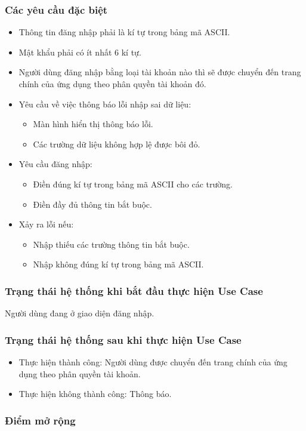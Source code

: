 \subsubsection{Các yêu cầu đặc biệt}
\begin{itemize}
  \item Thông tin đăng nhập phải là kí tự trong bảng mã ASCII.
  \item Mật khẩu phải có ít nhất 6 kí tự.
  \item Người dùng đăng nhập bằng loại tài khoản nào thì sẽ được chuyển đến trang chính của ứng dụng theo phân quyền tài khoản đó.
  \item Yêu cầu về việc thông báo lỗi nhập sai dữ liệu:
    \begin{itemize}
      \item Màn hình hiển thị thông báo lỗi.
      \item Các trường dữ liệu không hợp lệ được bôi đỏ.
    \end{itemize}
  \item Yêu cầu đăng nhập:
    \begin{itemize}
      \item Điền đúng kí tự trong bảng mã ASCII cho các trường.
      \item Điền đầy đủ thông tin bắt buộc.
    \end{itemize}
  \item Xảy ra lỗi nếu:
    \begin{itemize}
      \item Nhập thiếu các trường thông tin bắt buộc.
      \item Nhập không đúng kí tự trong bảng mã ASCII.
    \end{itemize}
\end{itemize}

\subsubsection{Trạng thái hệ thống khi bắt đầu thực hiện Use Case}
Người dùng đang ở giao diện đăng nhập.

\subsubsection{Trạng thái hệ thống sau khi thực hiện Use Case}
\begin{itemize}
  \item Thực hiện thành công: Người dùng được chuyển đến trang chính của ứng dụng theo phân quyền tài khoản.
  \item Thực hiện không thành công: Thông báo.
\end{itemize}

\subsubsection{Điểm mở rộng}